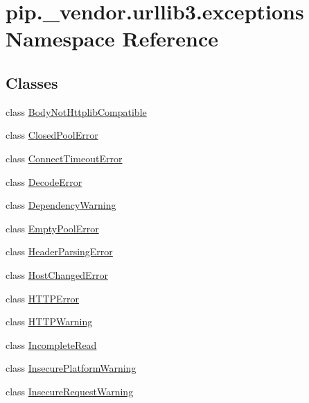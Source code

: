 \hypertarget{namespacepip_1_1__vendor_1_1urllib3_1_1exceptions}{}\section{pip.\+\_\+vendor.\+urllib3.\+exceptions Namespace Reference}
\label{namespacepip_1_1__vendor_1_1urllib3_1_1exceptions}
\subsection*{Classes}
\begin{DoxyCompactItemize}
\item 
class \hyperlink{classpip_1_1__vendor_1_1urllib3_1_1exceptions_1_1BodyNotHttplibCompatible}{Body\+Not\+Httplib\+Compatible}
\item 
class \hyperlink{classpip_1_1__vendor_1_1urllib3_1_1exceptions_1_1ClosedPoolError}{Closed\+Pool\+Error}
\item 
class \hyperlink{classpip_1_1__vendor_1_1urllib3_1_1exceptions_1_1ConnectTimeoutError}{Connect\+Timeout\+Error}
\item 
class \hyperlink{classpip_1_1__vendor_1_1urllib3_1_1exceptions_1_1DecodeError}{Decode\+Error}
\item 
class \hyperlink{classpip_1_1__vendor_1_1urllib3_1_1exceptions_1_1DependencyWarning}{Dependency\+Warning}
\item 
class \hyperlink{classpip_1_1__vendor_1_1urllib3_1_1exceptions_1_1EmptyPoolError}{Empty\+Pool\+Error}
\item 
class \hyperlink{classpip_1_1__vendor_1_1urllib3_1_1exceptions_1_1HeaderParsingError}{Header\+Parsing\+Error}
\item 
class \hyperlink{classpip_1_1__vendor_1_1urllib3_1_1exceptions_1_1HostChangedError}{Host\+Changed\+Error}
\item 
class \hyperlink{classpip_1_1__vendor_1_1urllib3_1_1exceptions_1_1HTTPError}{H\+T\+T\+P\+Error}
\item 
class \hyperlink{classpip_1_1__vendor_1_1urllib3_1_1exceptions_1_1HTTPWarning}{H\+T\+T\+P\+Warning}
\item 
class \hyperlink{classpip_1_1__vendor_1_1urllib3_1_1exceptions_1_1IncompleteRead}{Incomplete\+Read}
\item 
class \hyperlink{classpip_1_1__vendor_1_1urllib3_1_1exceptions_1_1InsecurePlatformWarning}{Insecure\+Platform\+Warning}
\item 
class \hyperlink{classpip_1_1__vendor_1_1urllib3_1_1exceptions_1_1InsecureRequestWarning}{Insecure\+Request\+Warning}

\end{DoxyCompactItemize}

